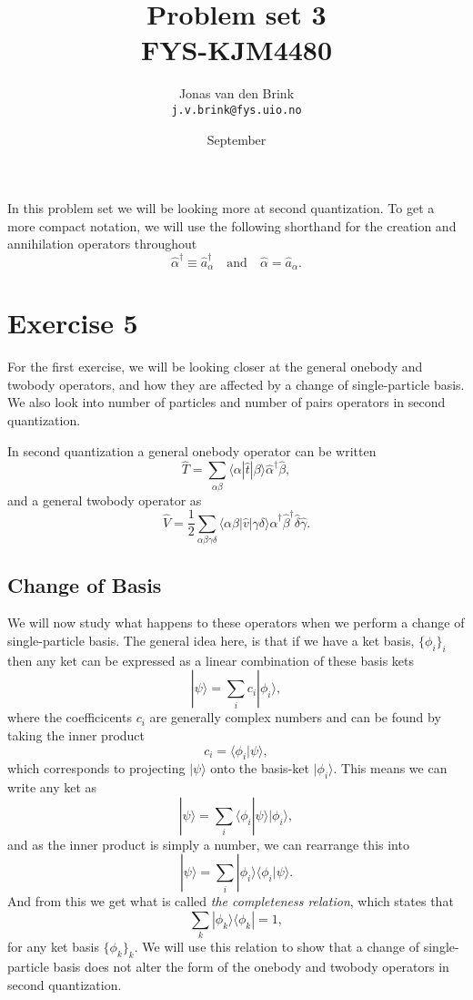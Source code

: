 \documentclass[a4paper, 11pt, notitlepage, english]{article}
\author{Jonas van den Brink \\ \texttt{j.v.brink@fys.uio.no}}
\title{Problem set 3 \\ FYS-KJM4480}
\date{September}
\newcommand{\bra}[1]{\langle #1|}
\newcommand{\ket}[1]{|#1 \rangle}
\newcommand{\braket}[2]{\langle #1 | #2 \rangle}
\newcommand{\op}[1]{\hat{#1}}
\newcommand{\braopket}[3]{\langle #1 | {#2} | #3 \rangle}
\newcommand{\ketbra}[2]{\ket{#1}\bra{#2}}
\begin{document}
\maketitle

In this problem set we will be looking more at second quantization. To get a more compact notation, we will use the following shorthand for the creation and annihilation operators throughout
$$\op{\alpha}^\dag \equiv \op{a}_\alpha^\dag \quad \mbox{and} \quad \op{\alpha} = \op{a}_\alpha.$$

\section*{Exercise 5}
For the first exercise, we will be looking closer at the general onebody and twobody operators, and how they are affected by a change of single-particle basis. We also look into number of particles and number of pairs operators in second quantization.

In second quantization a general onebody operator can be written
$$\op{T} = \sum_{\alpha\beta} \braopket{\alpha}{\op{t}}{\beta} \op{\alpha}^\dag \op{\beta},$$
and a general twobody operator as
$$\op{V} = \frac{1}{2}\sum_{\alpha\beta\gamma\delta} \braopket{\alpha\beta}{\op{v}}{\gamma\delta} \op{\alpha}^\dag \op{\beta}^\dag \op{\delta} \op{\gamma}.$$

\subsection*{Change of Basis}
We will now study what happens to these operators when we perform a change of single-particle basis. The general idea here, is that if we have a ket basis, $\{\phi_i\}_i$ then any ket can be expressed as a linear combination of these basis kets
$$\ket{\psi} = \sum_i c_i \ket{\phi_i},$$
where the coefficicents $c_i$ are generally complex numbers and can be found by taking the inner product 
$$c_i = \braket{\phi_i}{\psi},$$
which corresponds to projecting $\ket{\psi}$ onto the basis-ket $\ket{\phi_i}$. This means we can write any ket as
$$\ket{\psi} = \sum_i  \braket{\phi_i}{\psi}\ket{\phi_i},$$
and as the inner product is simply a number, we can rearrange this into
$$\ket{\psi} = \sum_i  \ket{\phi_i}\braket{\phi_i}{\psi}.$$
And from this we get what is called \emph{the completeness relation}, which states that 
$$\sum_k \ketbra{\phi_k}{\phi_k} = 1,$$
for any ket basis $\{\phi_k\}_k$. We will use this relation to show that a change of single-particle basis does not alter the form of the onebody and twobody operators in second quantization.
\end{document}
